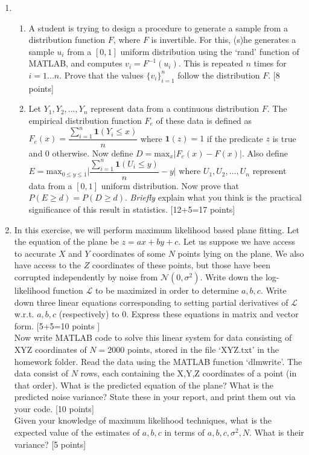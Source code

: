 \documentclass[11pt]{article}
\begin{document}
\begin{enumerate}
\item \begin{enumerate}
\item A student is trying to design a procedure to generate a sample from a distribution function $F$, where $F$ is invertible. For this, (s)he generates a sample $u_i$ from a $[0,1]$ uniform distribution using the `rand' function of MATLAB, and computes $v_i = F^{-1}(u_i)$. This is repeated $n$ times for $i = 1 ... n$. Prove that the values $\{v_i\}_{i=1}^n$  follow the distribution $F$. \textsf{[8 points]}
\item Let $Y_1, Y_2, ..., Y_n$ represent data from a continuous distribution $F$. The empirical distribution function $F_e$ of these data is defined as $F_e(x) = \dfrac{\sum_{i=1}^n \mathbf{1}(Y_i \leq x)}{n}$ where $\mathbf{1}(z) = 1$ if the predicate $z$ is true and 0 otherwise. Now define $D = \textrm{max}_x | F_e(x)-F(x) |$. Also define $E = \textrm{max}_{0 \leq y \leq 1} \Big|\dfrac{\sum_{i=1}^n \mathbf{1}(U_i \leq y)}{n} - y \Big|$ where $U_1, U_2, ..., U_n$ represent data from a $[0,1]$ uniform distribution. Now prove that $P(E \geq d) = P(D \geq d)$. \emph{Briefly} explain what you think is the practical significance of this result in statistics. \textsf{[12+5=17 points]}
\end{enumerate}

\item In this exercise, we will perform maximum likelihood based plane fitting. Let the equation of the plane be $z = ax + by + c$. Let us suppose we have access to accurate $X$ and $Y$ coordinates of some $N$ points lying on the plane. We also have access to the $Z$ coordinates of these points, but those have been corrupted independently by noise from $\mathcal{N}(0,\sigma^2)$. Write down the log-likelihood function $\mathcal{L}$ to be maximized in order to determine $a,b,c$. Write down three linear equations corresponding to setting partial derivatives of $\mathcal{L}$ w.r.t. $a,b,c$ (respectively) to 0. Express these equations in matrix and vector form. \textsf{[5+5=10 points ]} \\
Now write MATLAB code to solve this linear system for data consisting of XYZ coordinates of $N = 2000$ points, stored in the file `XYZ.txt' in the homework folder. Read the data using the MATLAB function `dlmwrite'. The data consist of $N$ rows, each containing the X,Y,Z coordinates of a point (in that order). What is the predicted equation of the plane? What is the predicted noise variance? State these in your report, and print them out via your code. \textsf{[10 points]}\\
Given your knowledge of maximum likelihood techniques, what is the expected value of the estimates of $a,b,c$ in terms of $a,b,c,\sigma^2,N$. What is their variance? \textsf{[5 points]}


\end{enumerate}
\end{document}
